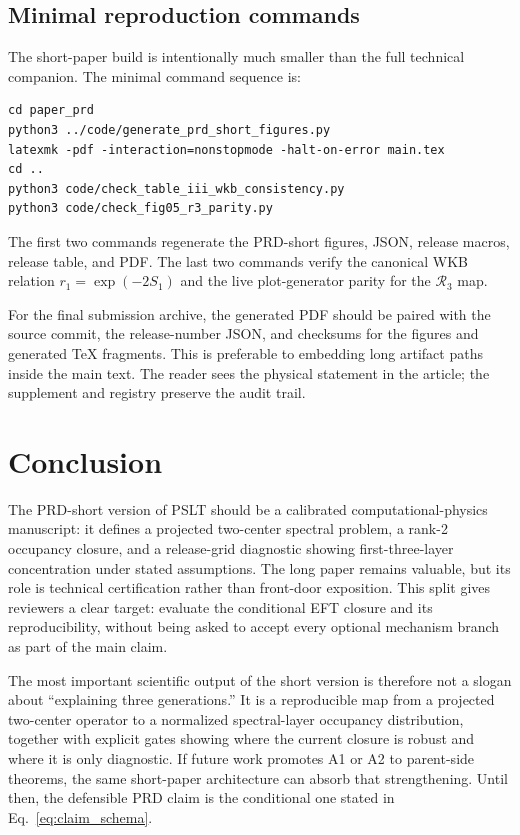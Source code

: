 \documentclass[aps,prd,onecolumn,notitlepage,nofootinbib,superscriptaddress,11pt,floatfix]{revtex4-2}
\newcommand{\Rthree}{\mathcal{R}_3}
\begin{document}
\subsection{Minimal reproduction commands}

The short-paper build is intentionally much smaller than the full technical companion.
The minimal command sequence is:
\begin{verbatim}
cd paper_prd
python3 ../code/generate_prd_short_figures.py
latexmk -pdf -interaction=nonstopmode -halt-on-error main.tex
cd ..
python3 code/check_table_iii_wkb_consistency.py
python3 code/check_fig05_r3_parity.py
\end{verbatim}
The first two commands regenerate the PRD-short figures, JSON, release macros, release table, and PDF.
The last two commands verify the canonical WKB relation \(r_1=\exp(-2S_1)\) and the live plot-generator parity for the \(\Rthree\) map.

For the final submission archive, the generated PDF should be paired with the source commit, the release-number JSON, and checksums for the figures and generated TeX fragments.
This is preferable to embedding long artifact paths inside the main text.
The reader sees the physical statement in the article; the supplement and registry preserve the audit trail.

\section{Conclusion}
\label{sec:conclusion}

The PRD-short version of PSLT should be a calibrated computational-physics manuscript: it defines a projected two-center spectral problem, a rank-2 occupancy closure, and a release-grid diagnostic showing first-three-layer concentration under stated assumptions.
The long paper remains valuable, but its role is technical certification rather than front-door exposition.
This split gives reviewers a clear target: evaluate the conditional EFT closure and its reproducibility, without being asked to accept every optional mechanism branch as part of the main claim.

The most important scientific output of the short version is therefore not a slogan about ``explaining three generations.''
It is a reproducible map from a projected two-center operator to a normalized spectral-layer occupancy distribution, together with explicit gates showing where the current closure is robust and where it is only diagnostic.
If future work promotes A1 or A2 to parent-side theorems, the same short-paper architecture can absorb that strengthening.
Until then, the defensible PRD claim is the conditional one stated in Eq.~\eqref{eq:claim_schema}.



\end{document}
